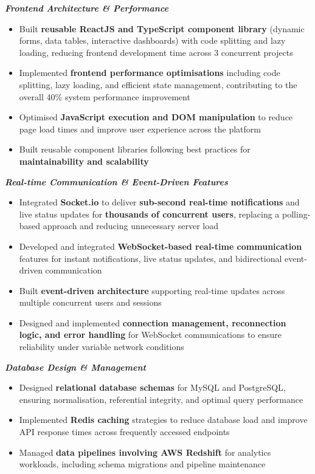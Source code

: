 \documentclass[a4paper,11.5pt]{article}
\newcommand{\h}[1]{\textbf{\textcolor{hgray}{#1}}}
\begin{document}
\vspace{0.25em}
\textit{\textbf{\textcolor{titlenavy}{\small Frontend Architecture \& Performance}}}
\begin{itemize}
  \item Built \h{reusable ReactJS and TypeScript component library} (dynamic forms, data tables, interactive dashboards) with code splitting and lazy loading, reducing frontend development time across 3 concurrent projects
  \item Implemented \h{frontend performance optimisations} including code splitting, lazy loading, and efficient state management, contributing to the overall 40\% system performance improvement
  \item Optimised \h{JavaScript execution and DOM manipulation} to reduce page load times and improve user experience across the platform
  \item Built reusable component libraries following best practices for \h{maintainability and scalability}
\end{itemize}

\vspace{0.25em}
\textit{\textbf{\textcolor{titlenavy}{\small Real-time Communication \& Event-Driven Features}}}
\begin{itemize}
  \item Integrated \h{Socket.io} to deliver \h{sub-second real-time notifications} and live status updates for \h{thousands of concurrent users}, replacing a polling-based approach and reducing unnecessary server load
  \item Developed and integrated \h{WebSocket-based real-time communication} features for instant notifications, live status updates, and bidirectional event-driven communication
  \item Built \h{event-driven architecture} supporting real-time updates across multiple concurrent users and sessions
  \item Designed and implemented \h{connection management, reconnection logic, and error handling} for WebSocket communications to ensure reliability under variable network conditions
\end{itemize}

\vspace{0.25em}
\textit{\textbf{\textcolor{titlenavy}{\small Database Design \& Management}}}
\begin{itemize}
  \item Designed \h{relational database schemas} for MySQL and PostgreSQL, ensuring normalisation, referential integrity, and optimal query performance
  \item Implemented \h{Redis caching} strategies to reduce database load and improve API response times across frequently accessed endpoints
  \item Managed \h{data pipelines involving AWS Redshift} for analytics workloads, including schema migrations and pipeline maintenance
\end{itemize}
\end{document}
